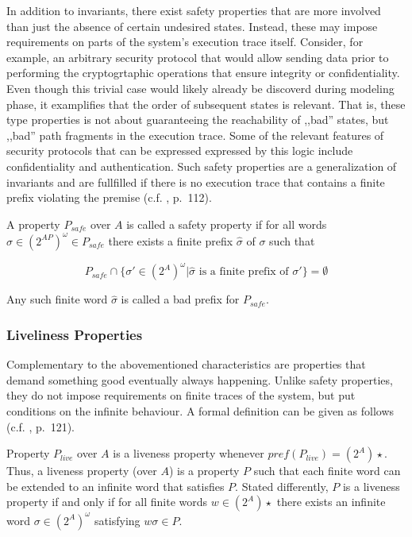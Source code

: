 In addition to invariants, there exist safety properties that are more involved than just the absence of certain undesired states.
Instead, these may impose requirements on parts of the system's execution trace itself.
Consider, for example, an arbitrary security protocol that would allow sending data prior to performing the cryptogrtaphic operations that ensure integrity or confidentiality.
Even though this trivial case would likely already be discoverd during modeling phase, it examplifies that the order of subsequent states is relevant.
That is, these type properties is not about guaranteeing the reachability of ,,bad'' states, but ,,bad'' path fragments in the execution trace.
Some of the relevant features of security protocols that can be expressed expressed by this logic include confidentiality and authentication.
Such safety properties are a generalization of invariants and are fullfilled if there is no execution trace that contains a finite prefix violating the premise (c.f. \cite{baier2008principles}, p.~112).

A property $P_{safe}$ over $A$ is called a safety property if for all words $\sigma \in (2^{AP})^{\omega} \in P_{safe}$ there exists a finite prefix $\widehat{\sigma}$ of $\sigma$ such that

\begin{equation*}
    P_{safe} \cap \{ \sigma' \in (2^{A})^{\omega} | \widehat{\sigma} \text{ is a finite prefix of } \sigma' \} = \emptyset
\end{equation*}

\noindent
Any such finite word $\widehat{\sigma}$ is called a bad prefix for $P_{safe}$.

\subsubsection{Liveliness Properties}

Complementary to the abovementioned characteristics are properties that demand something good eventually always happening.
Unlike safety properties, they do not impose requirements on finite traces of the system, but put conditions on the infinite behaviour.
A formal definition can be given as follows (c.f. \cite{baier2008principles}, p.~121).

Property $P_{live}$ over $A$ is a liveness property whenever $pref(P_{live}) = (2^{A})\star$.
Thus, a liveness property (over $A$) is a property $P$ such that each finite word can be extended to an infinite word that satisfies $P$.
Stated differently, $P$ is a liveness property if and only if for all finite words $w \in (2^{A})\star$ there exists an infinite word $\sigma \in (2^{A})^\omega$ satisfying $w \sigma \in P $.

